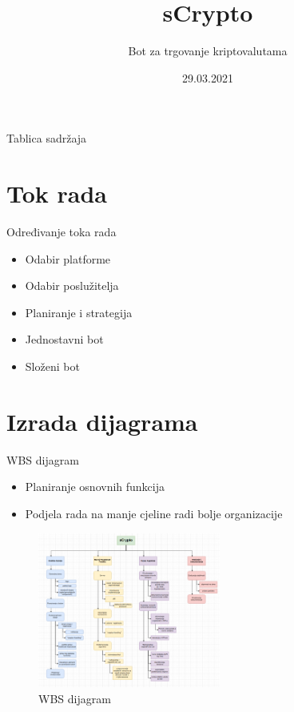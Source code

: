 \documentclass[aspectratio=169,xcolor=dvipsnames]{beamer}
\title[short title]{sCrypto}
\subtitle{Bot za trgovanje kriptovalutama}
\institute[RiTeh] 
{
Sveučilište u Rijeci - Tehnički fakultet 
}
\date{29.03.2021}
\begin{document}
\begin{frame}
  \titlepage
\end{frame}

\begin{frame}{Tablica sadržaja}
  \tableofcontents
\end{frame}

\section{Tok rada}

\begin{frame}{Određivanje toka rada}
    \begin{itemize}
        \item Odabir platforme
        \item Odabir poslužitelja
        \item Planiranje i strategija
        \item Jednostavni bot
        \item Složeni bot
    \end{itemize}
\end{frame}


\section{Izrada dijagrama}

\begin{frame}{WBS dijagram}
    \begin{itemize}
        \item Planiranje osnovnih funkcija 
        \item Podjela rada na manje cjeline radi bolje organizacije
    \end{itemize}
    \begin{figure}
        \centering
        \includegraphics[width=6cm]{wbs}
        \caption{WBS dijagram}
        \label{fig:wbs}
    \end{figure}
\end{frame}
\end{document}
